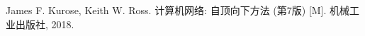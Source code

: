\begin{thebibliography}{99}  
 James F. Kurose, Keith W. Ross. 计算机网络: 自顶向下方法 (第7版) [M]. 机械工业出版社, 2018.
\end{thebibliography}